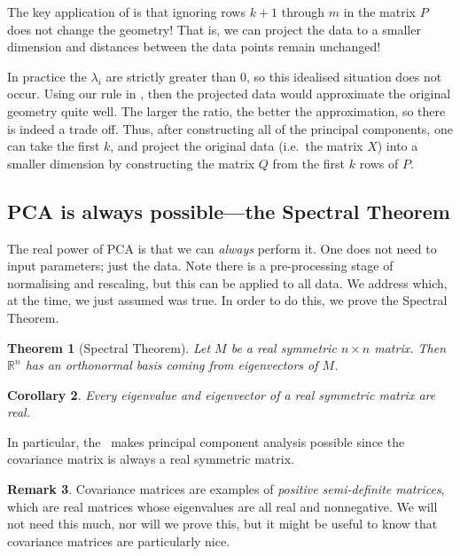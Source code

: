 \documentclass[a4paper, 12pt]{article}
\numberwithin{equation}{section}
\numberwithin{figure}{section}
\newtheorem{thm}{Theorem}[section]
\newtheorem{cor}[thm]{Corollary}
\theoremstyle{definition}
\newtheorem{remark}[thm]{Remark}
\newcommand{\R}{\mathbb{R}}
\begin{document}
The key application of  is that ignoring rows $k+1$ through
$m$ in the matrix $P$ does not change the geometry! That is, we can project the
data to a smaller dimension and distances between the data points remain
unchanged! 

In practice the $\lambda_i$ are strictly greater than $0$, so this idealised
situation does not occur. Using our rule in , then the
projected data would approximate the original geometry quite well. The larger
the ratio, the better the approximation, so there is indeed a trade off. Thus,
after constructing all of the principal components, one can take the first $k$,
and project the original data (i.e.\ the matrix $X$) into a smaller dimension by
constructing the matrix $Q$ from the first $k$ rows of $P$. 

\subsection{PCA is always possible---the Spectral Theorem}

The real power of PCA is that we can \textit{always} perform it. One does not
need to input parameters; just the data. Note there is a pre-processing stage of
normalising and rescaling, but this can be applied to all data. We address
 which, at the time, we just assumed was true. In order
to do this, we prove the Spectral Theorem.

\begin{thm}[Spectral Theorem]\label{thm:spectral-thm}
	Let $M$ be a real symmetric $n\times n$ matrix. Then $\R^n$ has an
	orthonormal basis coming from eigenvectors of $M$. 
\end{thm}

\begin{cor}
	Every eigenvalue and eigenvector of a real symmetric matrix are real.
\end{cor}

In particular, the~ makes principal component analysis
possible since the covariance matrix is always a real symmetric matrix. 

\begin{remark}
	Covariance matrices are examples of \textit{positive semi-definite
	matrices}, which are real matrices whose eigenvalues are all real and
	nonnegative. We will not need this much, nor will we prove this, but it
	might be useful to know that covariance matrices are particularly nice.
\end{remark}
\end{document}
